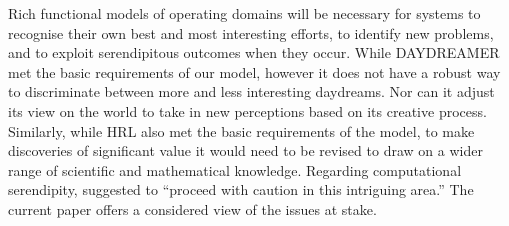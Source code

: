 Rich functional models of operating domains will be necessary for
systems to recognise their own best and most interesting efforts, to
identify new problems, and to exploit serendipitous outcomes when they
occur.  While {\sf DAYDREAMER} met the basic requirements of our
model, however it does not have a robust way to discriminate between
more and less interesting daydreams.  Nor can it adjust its view on
the world to take in new perceptions based on its creative process.
Similarly, while {\sf HRL} also met the basic requirements of the
model, to make discoveries of significant value it would need to be
revised to draw on a wider range of scientific and mathematical
knowledge.  Regarding computational serendipity,
\citet{pease2013discussion} suggested to ``proceed with caution in
this intriguing area.''  The current paper offers a considered view of
the issues at stake.

